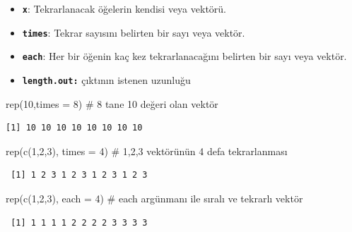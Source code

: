\documentclass[
  letterpaper,
  DIV=11,
  numbers=noendperiod]{scrreprt}
\newenvironment{Shaded}{\begin{snugshade}}{\end{snugshade}}
\newcommand{\AttributeTok}[1]{\textcolor[rgb]{0.40,0.45,0.13}{#1}}
\newcommand{\CommentTok}[1]{\textcolor[rgb]{0.37,0.37,0.37}{#1}}
\newcommand{\DecValTok}[1]{\textcolor[rgb]{0.68,0.00,0.00}{#1}}
\newcommand{\FunctionTok}[1]{\textcolor[rgb]{0.28,0.35,0.67}{#1}}
\newcommand{\NormalTok}[1]{\textcolor[rgb]{0.00,0.23,0.31}{#1}}
\begin{document}
\begin{itemize}
\item
  \textbf{\texttt{x}}: Tekrarlanacak öğelerin kendisi veya vektörü.
\item
  \textbf{\texttt{times}}: Tekrar sayısını belirten bir sayı veya
  vektör.
\item
  \textbf{\texttt{each}}: Her bir öğenin kaç kez tekrarlanacağını
  belirten bir sayı veya vektör.
\item
  \textbf{\texttt{length.out:}} çıktının istenen uzunluğu
\end{itemize}

\begin{Shaded}
\begin{Highlighting}[]
\FunctionTok{rep}\NormalTok{(}\DecValTok{10}\NormalTok{,}\AttributeTok{times =} \DecValTok{8}\NormalTok{) }\CommentTok{\# 8 tane 10 değeri olan vektör}
\end{Highlighting}
\end{Shaded}

\begin{verbatim}
[1] 10 10 10 10 10 10 10 10
\end{verbatim}

\begin{Shaded}
\begin{Highlighting}[]
\FunctionTok{rep}\NormalTok{(}\FunctionTok{c}\NormalTok{(}\DecValTok{1}\NormalTok{,}\DecValTok{2}\NormalTok{,}\DecValTok{3}\NormalTok{), }\AttributeTok{times =} \DecValTok{4}\NormalTok{) }\CommentTok{\# 1,2,3 vektörünün 4 defa tekrarlanması}
\end{Highlighting}
\end{Shaded}

\begin{verbatim}
 [1] 1 2 3 1 2 3 1 2 3 1 2 3
\end{verbatim}

\begin{Shaded}
\begin{Highlighting}[]
\FunctionTok{rep}\NormalTok{(}\FunctionTok{c}\NormalTok{(}\DecValTok{1}\NormalTok{,}\DecValTok{2}\NormalTok{,}\DecValTok{3}\NormalTok{), }\AttributeTok{each =} \DecValTok{4}\NormalTok{) }\CommentTok{\# each argünmanı ile sıralı ve tekrarlı vektör}
\end{Highlighting}
\end{Shaded}

\begin{verbatim}
 [1] 1 1 1 1 2 2 2 2 3 3 3 3
\end{verbatim}
\end{document}
